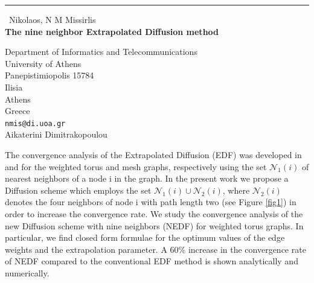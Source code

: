 \documentclass{report}
\begin{document}
\begin{center}
\rule{6in}{1pt} \
{\large Nikolaos, N M Missirlis \\
{\bf The nine neighbor Extrapolated Diffusion method}}

Department of Informatics and Telecommunications \\ University of Athens \\ Panepistimiopolis 15784 \\ Ilisia \\ Athens \\ Greece
\\
{\tt nmis@di.uoa.gr}\\
Aikaterini Dimitrakopoulou\end{center}




The convergence analysis of the Extrapolated Diffusion (EDF) was
developed in \cite{Kara04} and \cite{MarkoMiss10}
for the weighted torus and mesh graphs, respectively using the set
$\mathcal{N}_1(i)$ of nearest neighbors of a node i in the graph. In the
present work we propose a Diffusion scheme which employs the set
$\mathcal{N} _1(i)\cup \mathcal{N}_2(i)$, where $\mathcal{N}_2(i)$
denotes the four neighbors of node i with path length two (see Figure
\ref{fig1})
in order to increase the convergence rate. We study the convergence
analysis of the new Diffusion scheme with nine neighbors (NEDF) for
weighted torus graphs. In particular, we find closed form formulae for
the optimum values of the edge weights and the extrapolation parameter. A
60\% increase in the convergence rate of NEDF compared to the
conventional EDF method is shown analytically and numerically.
\end{document}

